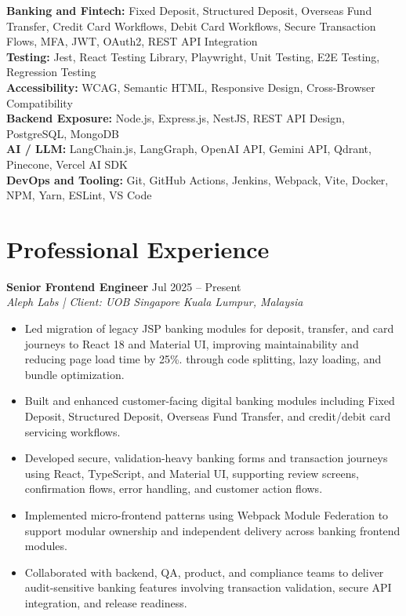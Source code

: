\documentclass[10pt,a4paper]{article}
\newcommand{\resumeSubheading}[4]{
  \textbf{#1} \hfill #2 \\
  \textit{#3} \hfill \textit{#4}
}
\begin{document}
\textbf{Banking and Fintech:} Fixed Deposit, Structured Deposit, Overseas Fund Transfer, Credit Card Workflows, Debit Card Workflows, Secure Transaction Flows, MFA, JWT, OAuth2, REST API Integration \\

\textbf{Testing:} Jest, React Testing Library, Playwright, Unit Testing, E2E Testing, Regression Testing \\

\textbf{Accessibility:} WCAG, Semantic HTML, Responsive Design, Cross-Browser Compatibility \\

\textbf{Backend Exposure:} Node.js, Express.js, NestJS, REST API Design, PostgreSQL, MongoDB \\

\textbf{AI / LLM:} LangChain.js, LangGraph, OpenAI API, Gemini API, Qdrant, Pinecone, Vercel AI SDK \\

\textbf{DevOps and Tooling:} Git, GitHub Actions, Jenkins, Webpack, Vite, Docker, NPM, Yarn, ESLint, VS Code

\section*{Professional Experience}

\resumeSubheading
{Senior Frontend Engineer}
{Jul 2025 -- Present}
{Aleph Labs | Client: UOB Singapore}
{Kuala Lumpur, Malaysia}

\begin{itemize}
    \item Led migration of legacy JSP banking modules for deposit, transfer, and card journeys to React 18 and Material UI, improving maintainability and reducing page load time by 25\%. through code splitting, lazy loading, and bundle optimization.
    \item Built and enhanced customer-facing digital banking modules including Fixed Deposit, Structured Deposit, Overseas Fund Transfer, and credit/debit card servicing workflows.
    \item Developed secure, validation-heavy banking forms and transaction journeys using React, TypeScript, and Material UI, supporting review screens, confirmation flows, error handling, and customer action flows.
    \item Implemented micro-frontend patterns using Webpack Module Federation to support modular ownership and independent delivery across banking frontend modules.
    \item Collaborated with backend, QA, product, and compliance teams to deliver audit-sensitive banking features involving transaction validation, secure API integration, and release readiness.
\end{itemize}
\end{document}
